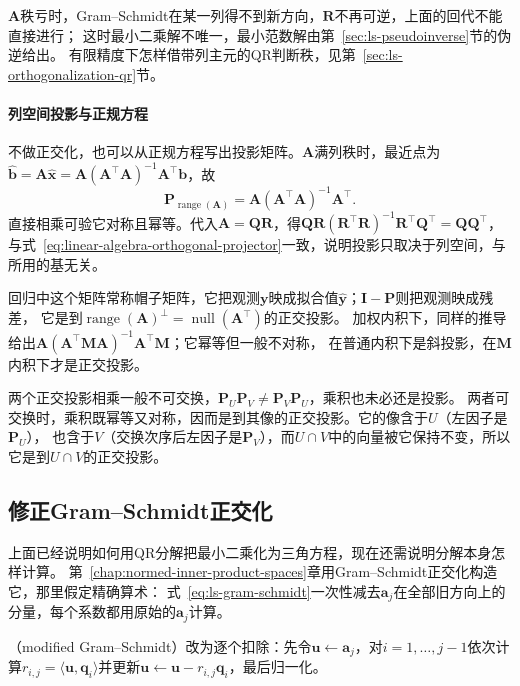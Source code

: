 $\bm A$秩亏时，Gram--Schmidt在某一列得不到新方向，$\bm R$不再可逆，上面的回代不能直接进行；
这时最小二乘解不唯一，最小范数解由第~\ref{sec:ls-pseudoinverse}节的伪逆给出。
有限精度下怎样借带列主元的QR判断秩，见第~\ref{sec:ls-orthogonalization-qr}节。

\paragraph{列空间投影与正规方程}

不做正交化，也可以从正规方程写出投影矩阵。$\bm A$满列秩时，最近点为
$\hat{\bm b}=\bm A\hat{\bm x}=\bm A(\bm A^\top\bm A)^{-1}\bm A^\top\bm b$，故
\begin{equation}
 \bm P_{\operatorname{range}(\bm A)}=\bm A(\bm A^\top\bm A)^{-1}\bm A^\top.
 \label{eq:ls-column-space-projector}
\end{equation}
直接相乘可验它对称且幂等。代入$\bm A=\bm Q\bm R$，得$\bm Q\bm R(\bm R^\top\bm R)^{-1}\bm R^\top\bm Q^\top=\bm Q\bm Q^\top$，
与式~\eqref{eq:linear-algebra-orthogonal-projector}一致，说明投影只取决于列空间，与所用的基无关。

回归中这个矩阵常称帽子矩阵，它把观测$\bm y$映成拟合值$\hat{\bm y}$；$\bm I-\bm P$则把观测映成残差，
它是到$\operatorname{range}(\bm A)^\perp=\operatorname{null}(\bm A^\top)$的正交投影。
加权内积下，同样的推导给出$\bm A(\bm A^\top\bm M\bm A)^{-1}\bm A^\top\bm M$；它幂等但一般不对称，
在普通内积下是斜投影，在$\bm M$内积下才是正交投影。

两个正交投影相乘一般不可交换，$\bm P_U\bm P_V\neq\bm P_V\bm P_U$，乘积也未必还是投影。
两者可交换时，乘积既幂等又对称，因而是到其像的正交投影。它的像含于$U$（左因子是$\bm P_U$），
也含于$V$（交换次序后左因子是$\bm P_V$），而$U\cap V$中的向量被它保持不变，所以它是到$U\cap V$的正交投影。


\subsection{修正Gram--Schmidt正交化}

上面已经说明如何用QR分解把最小二乘化为三角方程，现在还需说明分解本身怎样计算。
第~\ref{chap:normed-inner-product-spaces}章用Gram--Schmidt正交化构造它，那里假定精确算术：
式~\eqref{eq:ls-gram-schmidt}一次性减去$\bm a_j$在全部旧方向上的分量，每个系数都用原始的$\bm a_j$计算。

（modified Gram--Schmidt）改为逐个扣除：先令$\bm u\leftarrow\bm a_j$，对$i=1,\ldots,j-1$依次计算$r_{i,j}=\langle\bm u,\bm q_i\rangle$并更新$\bm u\leftarrow\bm u-r_{i,j}\bm q_i$，最后归一化。

